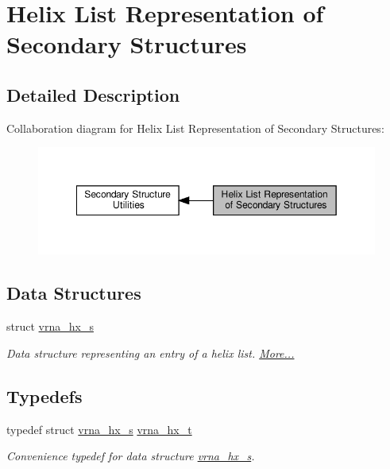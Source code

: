 \hypertarget{group__struct__utils__helix__list}{}\section{Helix List Representation of Secondary Structures}
\label{group__struct__utils__helix__list}


\subsection{Detailed Description}
Collaboration diagram for Helix List Representation of Secondary Structures\+:
\nopagebreak
\begin{figure}[H]
\begin{center}
\leavevmode
\includegraphics[width=349pt]{group__struct__utils__helix__list}
\end{center}
\end{figure}
\subsection*{Data Structures}
\begin{DoxyCompactItemize}
\item 
struct \hyperlink{group__struct__utils__helix__list_structvrna__hx__s}{vrna\+\_\+hx\+\_\+s}
\begin{DoxyCompactList}\small\item\em Data structure representing an entry of a helix list.  \hyperlink{group__struct__utils__helix__list_structvrna__hx__s}{More...}\end{DoxyCompactList}\end{DoxyCompactItemize}
\subsection*{Typedefs}
\begin{DoxyCompactItemize}
\item 
\mbox{\label{group__struct__utils__helix__list_ga877363f3a1703b53ecd025c6fcf897a0}} 
typedef struct \hyperlink{group__struct__utils__helix__list_structvrna__hx__s}{vrna\+\_\+hx\+\_\+s} \hyperlink{group__struct__utils__helix__list_ga877363f3a1703b53ecd025c6fcf897a0}{vrna\+\_\+hx\+\_\+t}
\begin{DoxyCompactList}\small\item\em Convenience typedef for data structure \hyperlink{group__struct__utils__helix__list_structvrna__hx__s}{vrna\+\_\+hx\+\_\+s}. \end{DoxyCompactList}\end{DoxyCompactItemize}
